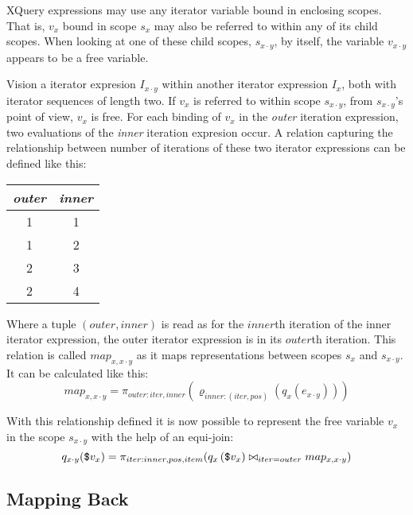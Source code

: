 XQuery expressions may use any iterator variable bound in enclosing scopes. That is, $v_{x}$ bound in
scope $s_{x}$ may also be referred to within any of its child scopes. When looking at one of these child scopes,
$s_{x \cdot y}$, by itself, the variable $v_{x \cdot y}$ appears to be a free variable.

Vision a iterator expresion $I_{x \cdot y}$ within another iterator expression $I_{x}$, both with iterator
sequences of length two. If $v_{x}$ is referred to within scope $s_{x \cdot y}$, from $s_{x \cdot y}$'s point of
view, $v_{x}$ is free. For each binding of $v_{x}$ in the \textit{outer} iteration expression, two
evaluations of the \textit{inner} iteration expresion occur. A relation capturing the relationship between number
of iterations of these two iterator expressions can be defined like this:

\begin{center}
\begin{tabular}{|c|c|}\hline
\textit{outer}	& \textit{inner} 	\\ \hline
1				& 1		\\ \hline
1				& 2		\\ \hline
2				& 3		\\ \hline
2				& 4		\\ \hline
\end{tabular}
\end{center}

Where a tuple $(outer, inner)$ is read as for the $inner$th iteration of the inner iterator expression, the outer
iterator expression is in its $outer$th iteration. This relation is called $map_{x, x\cdot y}$ as it maps
representations between scopes $s_{x}$ and $s_{x \cdot y}$. It can be calculated like this:
\begin{equation}
map_{x, x\cdot y} = \pi_{outer:iter,inner}(\varrho_{inner:(iter,pos)}(q_{x}(e_{x \cdot y})))
\label{eq:ll:mapx_xy}
\end{equation}

With this relationship defined it is now possible to represent the free variable $v_{x}$ in the scope $s_{x \cdot
y}$ with the help of an equi-join:
\begin{equation}
q_{x \cdot y}(\mbox{\texttt{\$}}v_{x}) = \pi_{iter:inner, pos,
item}(q_{x}\left(\mbox{\texttt{\$}}v_{x})\bowtie_{iter=outer} map_{x, x \cdot y}\right)
\label{eq:ll:qxy_vx}
\end{equation}

\subsection{Mapping Back}
\label{sect:trans:ll:mappingBack}

